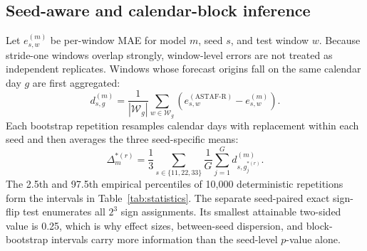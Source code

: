 \documentclass[fleqn,10pt]{wlscirep}
\newenvironment{changedcontent}{\color{changeblue}}{}
\begin{document}
\begin{changedcontent}
\begin{table}[p]
\centering
\caption{Complete METR-LA validation-candidate inventory. Rows are ordered by
validation MAE; candidate identifiers match the public configuration and
artifact names.}
\label{tab:validation_all_metr}
\scriptsize

\end{table}

\begin{table}[p]
\centering
\caption{Complete PeMS-BAY validation-candidate inventory. Rows are ordered by
validation MAE; candidate identifiers match the public configuration and
artifact names.}
\label{tab:validation_all_pems}
\scriptsize

\end{table}

\subsection{Seed-aware and calendar-block inference}
Let $e^{(m)}_{s,w}$ be per-window MAE for model $m$, seed $s$, and test window
$w$. Because stride-one windows overlap strongly, window-level errors are not
treated as independent replicates. Windows whose forecast origins fall on the
same calendar day $g$ are first aggregated:
\begin{equation}
d_{s,g}^{(m)}=\frac{1}{|\mathcal{W}_g|}
\sum_{w\in\mathcal{W}_g}
\left(e^{(\mathrm{ASTAF\mbox{-}R})}_{s,w}-e^{(m)}_{s,w}\right).
\label{eq:day_block_difference}
\end{equation}
Each bootstrap repetition resamples calendar days with replacement within
each seed and then averages the three seed-specific means:
\begin{equation}
\Delta^{*(r)}_m=\frac{1}{3}\sum_{s\in\{11,22,33\}}
\frac{1}{G}\sum_{j=1}^{G}d^{(m)}_{s,g^{*(r)}_j}.
\label{eq:block_bootstrap}
\end{equation}
The 2.5th and 97.5th empirical percentiles of 10,000 deterministic
repetitions form the intervals in Table~\ref{tab:statistics}. The separate
seed-paired exact sign-flip test enumerates all $2^3$ sign assignments. Its
smallest attainable two-sided value is 0.25, which is why effect sizes,
between-seed dispersion, and block-bootstrap intervals carry more information
than the seed-level $p$-value alone.


\end{changedcontent}
\end{document}

